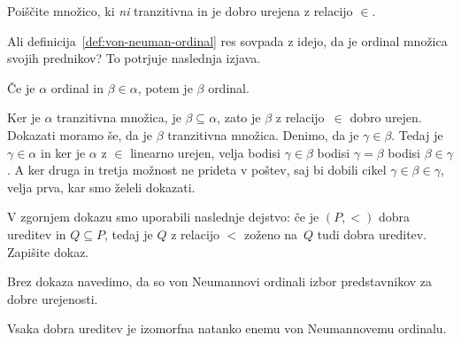 \begin{naloga}
  Poiščite množico, ki \emph{ni} tranzitivna in je dobro urejena z relacijo $\in$.
\end{naloga}

Ali definicija~\ref{def:von-neuman-ordinal} res sovpada z idejo, da je ordinal množica svojih prednikov? To potrjuje naslednja izjava.

\begin{izjava}
  Če je $\alpha$ ordinal in $\beta \in \alpha$, potem je $\beta$ ordinal.
\end{izjava}

\begin{dokaz}
  Ker je $\alpha$ tranzitivna množica, je $\beta \subseteq \alpha$, zato je $\beta$ z relacijo~$\in$ dobro urejen. Dokazati moramo še, da je $\beta$ tranzitivna množica. Denimo, da je $\gamma \in \beta$.
  Tedaj je $\gamma \in \alpha$ in ker je $\alpha$ z $\in$ linearno urejen, velja bodisi $\gamma \in \beta$ bodisi $\gamma = \beta$ bodisi $\beta \in \gamma$. A ker druga in tretja možnost ne prideta v poštev, saj bi dobili cikel $\gamma \in \beta \in \gamma$, velja prva, kar smo želeli dokazati.
\end{dokaz}

\begin{naloga}
  V zgornjem dokazu smo uporabili naslednje dejstvo: če je $(P, {<})$ dobra ureditev in $Q \subseteq P$, tedaj je $Q$ z relacijo $<$ zoženo na~$Q$ tudi dobra ureditev. Zapišite dokaz.
\end{naloga}

Brez dokaza navedimo, da so von Neumannovi ordinali izbor predstavnikov za dobre urejenosti.

\begin{izrek}
  Vsaka dobra ureditev je izomorfna natanko enemu von Neumannovemu ordinalu.
\end{izrek}

